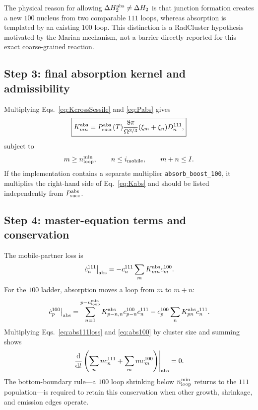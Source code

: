 \documentclass[11pt,a4paper]{article}
\newcommand{\code}[1]{\texttt{#1}}
\newcommand{\dd}{\mathrm d}
\newcommand{\rc}{\textsf{RadCluster}}
\begin{document}
The physical reason for allowing $\Delta H_2^{\rm abs}\ne\Delta H_2$ is that
junction formation creates a new $100$ nucleus from two comparable $111$ loops,
whereas absorption is templated by an existing $100$ loop.  This distinction is
a \rc{} hypothesis motivated by the Marian mechanism, not a barrier directly
reported for this exact coarse-grained reaction.

\subsection{Step 3: final absorption kernel and admissibility}

Multiplying Eqs.~\eqref{eq:KcrossSessile} and \eqref{eq:Pabs} gives
\begin{equation}
 \boxed{
 K_{mn}^{\rm abs}=P_{\rm succ}^{\rm abs}(T)
 \frac{8\pi}{\Omega^{2/3}}(\xi_m+\xi_n)D_n^{111},}                    \label{eq:Kabs}
\end{equation}
subject to
\begin{equation}
 m\ge n_{\rm loop}^{\min},\qquad n\le i_{\rm mobile},\qquad m+n\le I. \label{eq:absAdmiss}
\end{equation}
If the implementation contains a separate multiplier
\code{absorb\_boost\_100}, it multiplies the right-hand side of
Eq.~\eqref{eq:Kabs} and should be listed independently from
$P_{\rm succ}^{\rm abs}$.

\subsection{Step 4: master-equation terms and conservation}

The mobile-partner loss is
\begin{equation}
 \left.\dot c_n^{111}\right|_{\rm abs}
 =-c_n^{111}\sum_mK_{mn}^{\rm abs}c_m^{100}.                          \label{eq:abs111loss}
\end{equation}
For the $100$ ladder, absorption moves a loop from $m$ to $m+n$:
\begin{equation}
 \left.\dot c_p^{100}\right|_{\rm abs}
 =\sum_{n=1}^{p-n_{\rm loop}^{\min}}
 K_{p-n,n}^{\rm abs}c_{p-n}^{100}c_n^{111}
 -c_p^{100}\sum_nK_{pn}^{\rm abs}c_n^{111}.                          \label{eq:abs100}
\end{equation}
Multiplying Eqs.~\eqref{eq:abs111loss} and \eqref{eq:abs100} by cluster size and
summing shows
\begin{equation}
 \left.\frac{\dd}{\dd t}
 \left(\sum_nnc_n^{111}+\sum_mmc_m^{100}\right)\right|_{\rm abs}=0. \label{eq:absCons}
\end{equation}
The bottom-boundary rule---a $100$ loop shrinking below
$n_{\rm loop}^{\min}$ returns to the $111$ population---is required to retain
this conservation when other growth, shrinkage, and emission edges operate.
\end{document}
